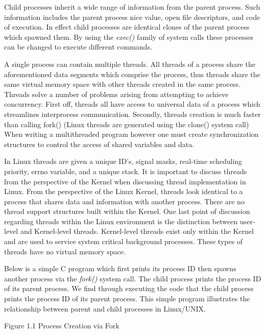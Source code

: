     \normalfont \indent Child processes inherit a wide range of information from the parent process. Such information includes the parent process nice value, open file descriptors, and code of execution. In effect child processes are identical clones of the parent process which spawned them. By using the \textit{exec()} family of system calls these processes can be changed to execute different commands.

    \normalfont \indent A single process can contain multiple threads. All threads of a process share the aforementioned data segments which comprise the process, thus threads share the same virtual memory space with other threads created in the same process. Threads solve a number of problems arising from attempting to achieve concurrency. First off, threads all have access to universal data of a process which streamlines interprocess communication. Secondly, threads creation is much faster than calling fork() (Linux threads are generated using the clone() system call) When writing a multithreaded program however one must create synchronization structures to control the access of shared variables and data.

    \normalfont \indent In Linux threads are given a unique ID’s, signal masks, real-time scheduling priority, errno variable, and a unique stack. It is important to discuss threads from the perspective of the Kernel when discussing thread implementation in Linux. From the perspective of the Linux Kernel, threads look identical to a process that shares data and information with another process. There are no thread support  structures built within the Kernel. One last point of discussion regarding threads within the Linux environment is the distinction between user-level and Kernel-level threads. Kernel-level threads exist only within the Kernel and are used to service system critical background processes. These types of threads have no virtual  memory space.

\newpage
	\normalfont \indent Below is a simple C program which first prints its process ID then spawns another process via the \textit{fork()} system call. The child process prints the process ID of its parent process. We find through executing the code that the child process prints the process ID of its parent process. This simple
program illustrates the relationship between parent and child processes in Linux/UNIX.


\begin{center}
Figure 1.1 Process Creation via Fork  
\end{center}

